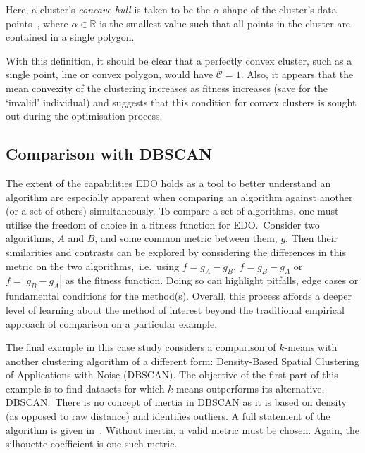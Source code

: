 Here, a cluster's \emph{concave hull} is taken to be the \(\alpha\)-shape of the
cluster's data points~\cite{Edelsbrunner1983}, where \(\alpha \in \mathbb R\) is
the smallest value such that all points in the cluster are contained in a single
polygon.

With this definition, it should be clear that a perfectly convex cluster, such
as a single point, line or convex polygon, would have \(\mathcal{C} = 1\). Also,
it appears that the mean convexity of the clustering increases as fitness
increases (save for the `invalid' individual) and suggests that this condition
for convex clusters is sought out during the optimisation process.


\subsection{Comparison with DBSCAN}\label{subsec:dbscan}

The extent of the capabilities EDO holds as a tool to better understand an
algorithm are especially apparent when comparing an algorithm against another
(or a set of others) simultaneously. To compare a set of algorithms, one must
utilise the freedom of choice in a fitness function for EDO.\ Consider two
algorithms, \(A\) and \(B\), and some common metric between them, \(g\). Then
their similarities and contrasts can be explored by considering the differences
in this metric on the two algorithms,~i.e.\ using \(f=g_A-g_B\), \(f=g_B-g_A\)
or \(f=\left|g_B-g_A\right|\) as the fitness function. Doing so can highlight
pitfalls, edge cases or fundamental conditions for the method(s). Overall, this
process affords a deeper level of learning about the method of interest beyond
the traditional empirical approach of comparison on a particular example.

The final example in this case study considers a comparison of \(k\)-means with
another clustering algorithm of a different form: Density-Based Spatial
Clustering of Applications with Noise (DBSCAN). The objective of the first part
of this example is to find datasets for which \(k\)-means outperforms its
alternative, DBSCAN.\ There is no concept of inertia in DBSCAN as it is based on
density (as opposed to raw distance) and identifies outliers. A full statement
of the algorithm is given in~\cite{Ester1996}. Without inertia, a valid metric
must be chosen. Again, the silhouette coefficient is one such metric.

